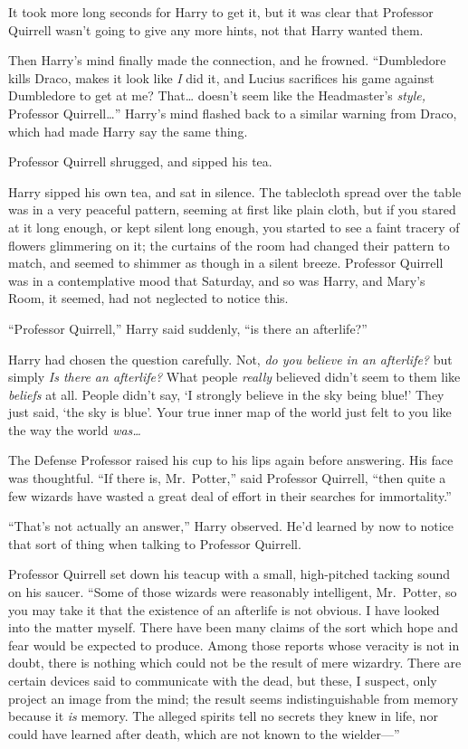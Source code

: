 It took more long seconds for Harry to get it, but it was clear that
Professor Quirrell wasn't going to give any more hints, not that Harry
wanted them.

Then Harry's mind finally made the connection, and he frowned.
``Dumbledore kills Draco, makes it look like \emph{I} did it, and Lucius
sacrifices his game against Dumbledore to get at me? That\ldots{}
doesn't seem like the Headmaster's \emph{style,} Professor
Quirrell\ldots{}'' Harry's mind flashed back to a similar warning from
Draco, which had made Harry say the same thing.

Professor Quirrell shrugged, and sipped his tea.

Harry sipped his own tea, and sat in silence. The tablecloth spread over
the table was in a very peaceful pattern, seeming at first like plain
cloth, but if you stared at it long enough, or kept silent long enough,
you started to see a faint tracery of flowers glimmering on it; the
curtains of the room had changed their pattern to match, and seemed to
shimmer as though in a silent breeze. Professor Quirrell was in a
contemplative mood that Saturday, and so was Harry, and Mary's Room, it
seemed, had not neglected to notice this.

``Professor Quirrell,'' Harry said suddenly, ``is there an afterlife?''

Harry had chosen the question carefully. Not, \emph{do you believe in an
afterlife?} but simply \emph{Is there an afterlife?} What people
\emph{really} believed didn't seem to them like \emph{beliefs} at all.
People didn't say, `I strongly believe in the sky being blue!' They just
said, `the sky is blue'. Your true inner map of the world just felt to
you like the way the world \emph{was\ldots{}}

The Defense Professor raised his cup to his lips again before answering.
His face was thoughtful. ``If there is, Mr.~Potter,'' said Professor
Quirrell, ``then quite a few wizards have wasted a great deal of effort
in their searches for immortality.''

``That's not actually an answer,'' Harry observed. He'd learned by now
to notice that sort of thing when talking to Professor Quirrell.

Professor Quirrell set down his teacup with a small, high-pitched
tacking sound on his saucer. ``Some of those wizards were reasonably
intelligent, Mr.~Potter, so you may take it that the existence of an
afterlife is not obvious. I have looked into the matter myself. There
have been many claims of the sort which hope and fear would be expected
to produce. Among those reports whose veracity is not in doubt, there is
nothing which could not be the result of mere wizardry. There are
certain devices said to communicate with the dead, but these, I suspect,
only project an image from the mind; the result seems indistinguishable
from memory because it \emph{is} memory. The alleged spirits tell no
secrets they knew in life, nor could have learned after death, which are
not known to the wielder---''

